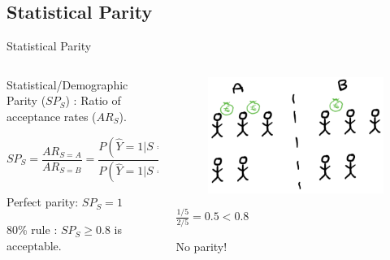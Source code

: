 \documentclass[handout,aspectratio=169]{beamer}
\begin{document}
\subsection{Statistical Parity}
\begin{frame}{Statistical Parity}

\begin{columns} 
    \begin{column}{.5\textwidth}

        Statistical/Demographic Parity 
 ($SP_S$) \cite{hardt2016equalisedodds}: Ratio of acceptance rates ($AR_S$).

        \begin{equation*}
            SP_{S} = \frac{AR_{S=A}}{AR_{S=B}} = \frac{P(\hat{Y}=1|S=A)}{P(\hat{Y}=1|S=B)} 
        \end{equation*}
        
        Perfect parity: $SP_S = 1$
        
        
        80\% rule \cite{feldman2015certifying}: $SP_S \geq 0.8$ is acceptable.

    \end{column}
    
    \begin{column}{.5\textwidth}
    \begin{center}
        \begin{figure}
            \includegraphics[width=.8\textwidth]{img/no_parity.png}
        \end{figure}
        $\frac{1/5}{2/5} = 0.5 < 0.8$
        
        \alert{No parity!}
    \end{center}
        
    \end{column}
    

    \renewcommand{\thefootnote}{\fnsymbol{footnote}}
    
    
\end{columns}
\end{frame}
\end{document}
